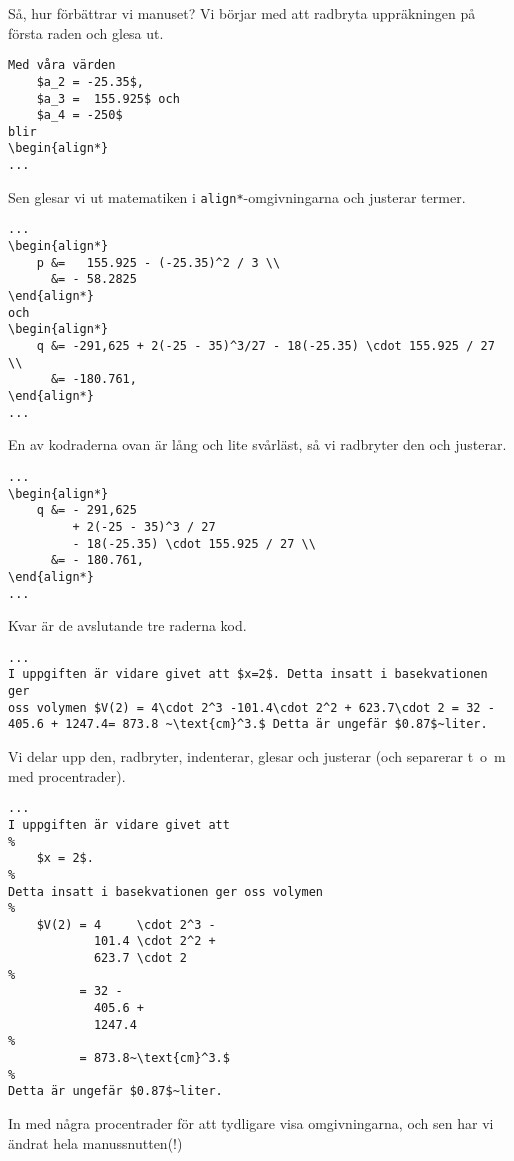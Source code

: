 \documentclass[a4paper,12pt]{article}
\begin{document}
Så, hur förbättrar vi manuset? Vi börjar med att radbryta uppräkningen
på första raden och glesa ut.
%
\begin{lstlisting}
Med våra värden 
    $a_2 = -25.35$, 
    $a_3 =  155.925$ och 
    $a_4 = -250$ 
blir
\begin{align*}
...
\end{lstlisting}
%
Sen glesar vi ut matematiken i \texttt{align*}-omgivningarna och
justerar termer. 
%
\begin{lstlisting} 
...
\begin{align*}
    p &=   155.925 - (-25.35)^2 / 3 \\
      &= - 58.2825
\end{align*}
och
\begin{align*}
    q &= -291,625 + 2(-25 - 35)^3/27 - 18(-25.35) \cdot 155.925 / 27 \\
      &= -180.761,
\end{align*}
...
\end{lstlisting}
%
En av kodraderna ovan är lång och lite svårläst, så vi radbryter den
och justerar.
%
\begin{lstlisting} 
...
\begin{align*}
    q &= - 291,625  
         + 2(-25 - 35)^3 / 27 
         - 18(-25.35) \cdot 155.925 / 27 \\
      &= - 180.761,
\end{align*}
...
\end{lstlisting}
%
Kvar är de avslutande tre raderna kod.
%
\begin{lstlisting}
...
I uppgiften är vidare givet att $x=2$. Detta insatt i basekvationen ger
oss volymen $V(2) = 4\cdot 2^3 -101.4\cdot 2^2 + 623.7\cdot 2 = 32 -
405.6 + 1247.4= 873.8 ~\text{cm}^3.$ Detta är ungefär $0.87$~liter.
\end{lstlisting}
Vi delar upp den, radbryter, indenterar, glesar och justerar (och separerar
t~o~m med procentrader).
%
\begin{lstlisting}
...
I uppgiften är vidare givet att 
%
    $x = 2$. 
%
Detta insatt i basekvationen ger oss volymen 
%
    $V(2) = 4     \cdot 2^3 - 
            101.4 \cdot 2^2 +
            623.7 \cdot 2 
%
          = 32 - 
            405.6 + 
            1247.4
%
          = 873.8~\text{cm}^3.$ 
%
Detta är ungefär $0.87$~liter.
\end{lstlisting}
%
In med några procentrader för att tydligare visa omgivningarna, och
sen har vi ändrat hela manussnutten(!)
%
\label{page:vn} 
\end{document}
